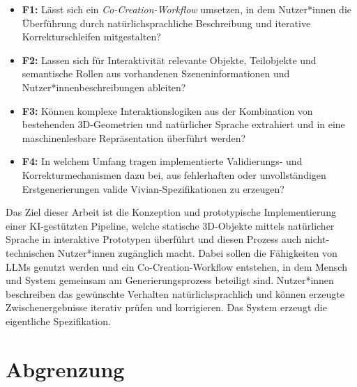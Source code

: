 \begin{itemize}
	\item \textbf{F1:} Lässt sich ein \textit{Co-Creation-Workflow} umsetzen, in dem Nutzer*innen die Überführung durch natürlichsprachliche Beschreibung und iterative Korrekturschleifen mitgestalten?
	\item \textbf{F2:} Lassen sich für Interaktivität relevante Objekte, Teilobjekte und semantische Rollen aus vorhandenen Szeneninformationen und Nutzer*innenbeschreibungen ableiten?
	\item \textbf{F3:} Können komplexe Interaktionslogiken aus der Kombination von bestehenden 3D-Geometrien und natürlicher Sprache extrahiert und in eine maschinenlesbare Repräsentation überführt werden?
	\item \textbf{F4:} In welchem Umfang tragen implementierte Validierungs- und Korrekturmechanismen dazu bei, aus fehlerhaften oder unvollständigen Erstgenerierungen valide Vivian-Spezifikationen zu erzeugen?
\end{itemize}

Das Ziel dieser Arbeit ist die Konzeption und prototypische Implementierung einer KI-gestützten Pipeline, welche statische 3D-Objekte mittels natürlicher Sprache in interaktive Prototypen überführt und diesen Prozess auch nicht-technischen Nutzer*innen zugänglich macht. Dabei sollen die Fähigkeiten von LLMs genutzt werden und ein Co-Creation-Workflow entstehen, in dem Mensch und System gemeinsam am Generierungsprozess beteiligt sind. Nutzer*innen beschreiben das gewünschte Verhalten natürlichsprachlich und können erzeugte Zwischenergebnisse iterativ prüfen und korrigieren. Das System erzeugt die eigentliche Spezifikation.

\section{Abgrenzung}\label{sec:abgrenzung}

